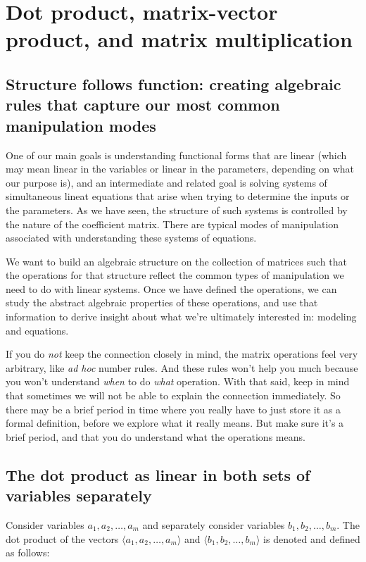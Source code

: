 \documentclass[10pt]{amsart}
\begin{document}
\section{Dot product, matrix-vector product, and matrix multiplication}

\subsection{Structure follows function: creating algebraic rules that capture our most common manipulation modes}

One of our main goals is understanding functional forms that are
linear (which may mean linear in the variables or linear in the
parameters, depending on what our purpose is), and an intermediate and
related goal is solving systems of simultaneous lineat equations that
arise when trying to determine the inputs or the parameters. As we
have seen, the structure of such systems is controlled by the nature
of the coefficient matrix. There are typical modes of manipulation
associated with understanding these systems of equations.

We want to build an algebraic structure on the collection of matrices
such that the operations for that structure reflect the common types
of manipulation we need to do with linear systems. Once we have
defined the operations, we can study the abstract algebraic properties
of these operations, and use that information to derive insight about
what we're ultimately interested in: modeling and equations.

If you do {\em not} keep the connection closely in mind, the matrix
operations feel very arbitrary, like {\em ad hoc} number rules. And
these rules won't help you much because you won't understand {\em
  when} to do {\em what} operation. With that said, keep in mind that
sometimes we will not be able to explain the connection
immediately. So there may be a brief period in time where you really
have to just store it as a formal definition, before we explore what
it really means. But make sure it's a brief period, and that you do
understand what the operations means.

\subsection{The dot product as linear in both sets of variables separately}

Consider variables $a_1,a_2,\dots,a_m$ and separately consider
variables $b_1,b_2,\dots,b_m$. The dot product of the vectors $\langle
a_1,a_2,\dots,a_m \rangle$ and $\langle b_1,b_2,\dots,b_m \rangle$ is
denoted and defined as follows:
\end{document}
